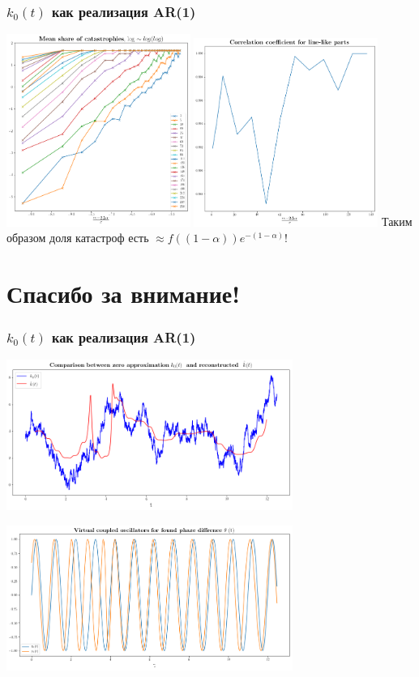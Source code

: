 \documentclass{beamer}
\begin{document}
\begin{frame}
\frametitle{$k_0(t)$ как реализация AR(1)}
\phantom{123}
\begin{center}
	\includegraphics[width=0.45\textwidth]{sh2.png} 
	\includegraphics[width=0.45\textwidth]{sh3.png}
Таким образом доля катастроф есть $\approx f((1-\alpha))e^{-(1-\alpha)}$!
\end{center}

\end{frame}

\section{Спасибо за внимание!}

\begin{frame}
\frametitle{$k_0(t)$ как реализация AR(1)}
\phantom{123}
\begin{center}
	\includegraphics[width=0.7\textwidth]{stk2-1.png} 
	
	\includegraphics[width=0.7\textwidth]{stk2-3.png}
\end{center}
\end{frame}
\end{document}
